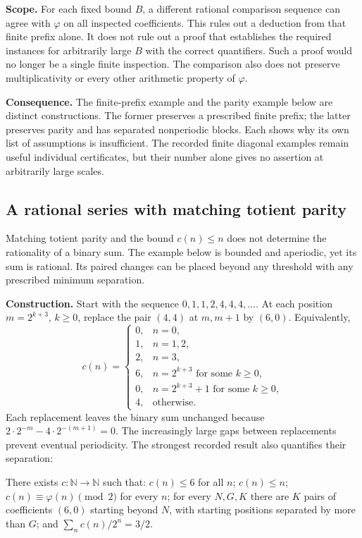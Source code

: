 \textbf{Scope.} For each fixed bound $B$, a different rational
comparison sequence can agree with $\varphi$ on all inspected coefficients.
This rules out a deduction from that finite prefix alone. It does not rule
out a proof that establishes the required instances for arbitrarily large
$B$ with the correct quantifiers. Such a proof would no longer be a single
finite inspection. The comparison also does not preserve multiplicativity
or every other arithmetic property of $\varphi$.


\textbf{Consequence.} The finite-prefix example and the parity example
below are distinct constructions. The former preserves a prescribed finite
prefix; the latter preserves parity and has separated nonperiodic blocks.
Each shows why its own list of assumptions is insufficient. The recorded
finite diagonal examples remain useful individual certificates, but their
number alone gives no assertion at arbitrarily large scales.


\subsection{A rational series with matching totient parity}
\label{sec:parity-countermodel}

Matching totient parity and the bound $c(n)\le n$ does not determine
the rationality of a binary sum. The example below is bounded and
aperiodic, yet its sum is rational. Its paired changes can be placed
beyond any threshold with any prescribed minimum separation.

\textbf{Construction.} Start with the sequence
$0,1,1,2,4,4,4,\ldots$. At each position $m=2^{k+3}$, $k\ge0$, replace
the pair $(4,4)$ at $m,m+1$ by $(6,0)$. Equivalently,
\[
 c(n)=
 \begin{cases}
  0,&n=0,\\
  1,&n=1,2,\\
  2,&n=3,\\
  6,&n=2^{k+3}\text{ for some }k\ge0,\\
  0,&n=2^{k+3}+1\text{ for some }k\ge0,\\
  4,&\text{otherwise}.
 \end{cases}
\]
Each replacement leaves the binary sum unchanged because
$2\cdot2^{-m}-4\cdot2^{-(m+1)}=0$. The increasingly large gaps between
replacements prevent eventual periodicity. The strongest recorded result
also quantifies their separation:
\begin{prop}\label{prop:rational-series-preserving-totient-parity}
There exists \(c:\mathbb N\to\mathbb N\) such that: \(c(n)\le6\) for all
\(n\); \(c(n)\le n\); \(c(n)\equiv\varphi(n)\pmod2\) for every \(n\); for
every \(N,G,K\) there are \(K\) pairs of coefficients \((6,0)\)
starting beyond \(N\), with starting positions separated by more
than \(G\); and
\(\sum_n c(n)/2^n = 3/2\).
\end{prop}

